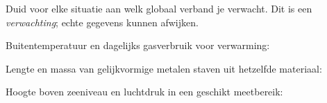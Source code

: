 \documentclass{ximera}
\begin{document}
\begin{oefening}{\oefB \ESS}

Duid voor elke situatie aan welk globaal verband je verwacht.
Dit is een \emph{verwachting}; echte gegevens kunnen afwijken.

\begin{question}
Buitentemperatuur en dagelijks gasverbruik voor verwarming:

\begin{multipleChoice}
\end{multipleChoice}
\end{question}

\begin{question}
Lengte en massa van gelijkvormige metalen staven uit hetzelfde materiaal:

\begin{multipleChoice}
\end{multipleChoice}
\end{question}

\begin{question}
Hoogte boven zeeniveau en luchtdruk in een geschikt meetbereik:

\begin{multipleChoice}
\end{multipleChoice}
\end{question}
\end{oefening}
\end{document}

